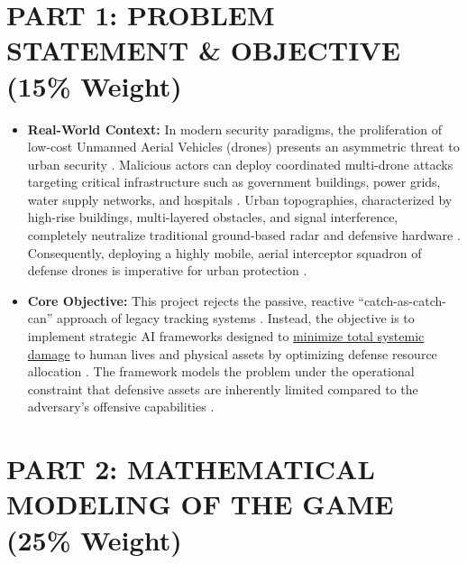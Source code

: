 \documentclass[11pt,a4paper]{article}
\begin{document}
\vspace{0.5cm}

\section{PART 1: PROBLEM STATEMENT \& OBJECTIVE (15\% Weight)}

\begin{itemize}
    \item \textbf{Real-World Context:} In modern security paradigms, the proliferation of low-cost Unmanned Aerial Vehicles (drones) presents an asymmetric threat to urban security \cite{mutzari2025defending}. Malicious actors can deploy coordinated multi-drone attacks targeting critical infrastructure such as government buildings, power grids, water supply networks, and hospitals \cite{mutzari2025defending}. Urban topographies, characterized by high-rise buildings, multi-layered obstacles, and signal interference, completely neutralize traditional ground-based radar and defensive hardware \cite{mutzari2025defending}. Consequently, deploying a highly mobile, aerial interceptor squadron of defense drones is imperative for urban protection \cite{mutzari2025defending}.
    \item \textbf{Core Objective:} This project rejects the passive, reactive ``catch-as-catch-can'' approach of legacy tracking systems \cite{mutzari2025defending}. Instead, the objective is to implement strategic AI frameworks designed to \underline{minimize total systemic damage} to human lives and physical assets by optimizing defense resource allocation \cite{mutzari2025defending}. The framework models the problem under the operational constraint that defensive assets are inherently limited compared to the adversary's offensive capabilities \cite{mutzari2025defending}.
\end{itemize}

\section{PART 2: MATHEMATICAL MODELING OF THE GAME (25\% Weight)}
\end{document}
